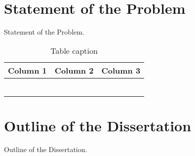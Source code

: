 \section{Statement of the Problem}
Statement of the Problem.


\begin{table}[htbp!!]
\center
\caption{Table caption}
\label{table1_RM}
\begin{tabular}{ccc}
\toprule
Column 1 & Column 2 &  Column 3\\ \hline
 &  & \\
 &  & \\
 &  & \\
 &  & \\
 &  & \\
&  & \\
\bottomrule
\end{tabular}
\end{table}



\section{Outline of the Dissertation}
Outline of the Dissertation.


 